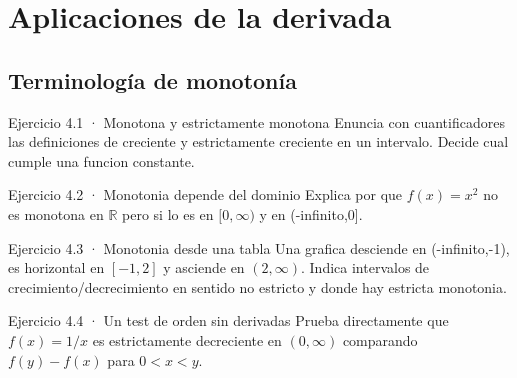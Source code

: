 \documentclass[10pt,a4paper,oneside,openany]{book}
\begin{document}
\chapter{Aplicaciones de la derivada}
\section{Terminología de monotonía}
\begin{PSevenExerciseFixed}{Ejercicio 4.1 · Monotona y estrictamente monotona}
Enuncia con cuantificadores las definiciones de creciente y estrictamente creciente en un intervalo. Decide cual cumple una funcion constante.
\end{PSevenExerciseFixed}
\begin{PSevenExerciseFixed}{Ejercicio 4.2 · Monotonia depende del dominio}
Explica por que \(f(x)=x^{2}\) no es monotona en \(\mathbb{R}\) pero si lo es en \([0,\infty )\) y en (-infinito,0].
\end{PSevenExerciseFixed}
\begin{PSevenExerciseFixed}{Ejercicio 4.3 · Monotonia desde una tabla}
Una grafica desciende en (-infinito,-1), es horizontal en \([-1,2]\) y asciende en \((2,\infty )\). Indica intervalos de crecimiento/decrecimiento en sentido no estricto y donde hay estricta monotonia.
\end{PSevenExerciseFixed}
\begin{PSevenExerciseFixed}{Ejercicio 4.4 · Un test de orden sin derivadas}
Prueba directamente que \(f(x)=1/x\) es estrictamente decreciente en \((0,\infty )\) comparando \(f(y)-f(x)\) para \(0<x<y\).
\end{PSevenExerciseFixed}
\end{document}

